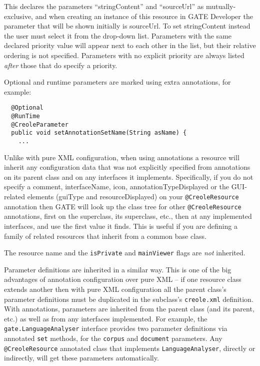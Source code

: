 This declares the parameters ``stringContent'' and ``sourceUrl'' as
mutually-exclusive, and when creating an instance of this resource in GATE
Developer the parameter that will be shown initially is sourceUrl.  To set
stringContent instead the user must select it from the drop-down list.
Parameters with the same declared priority value will appear next to each other
in the list, but their relative ordering is not specified.  Parameters with no
explicit priority are always listed {\it after} those that do specify a
priority.

Optional and runtime parameters are marked using extra annotations, for example:
\begin{lstlisting}
  @Optional
  @RunTime
  @CreoleParameter
  public void setAnnotationSetName(String asName) {
    ...
\end{lstlisting}


Unlike with pure XML configuration, when using annotations a resource
will inherit any configuration data that was not explicitly specified
from annotations on its parent class and on any interfaces it
implements.  Specifically, if you do not specify a comment,
interfaceName, icon, annotationTypeDisplayed or the GUI-related
elements (guiType and resourceDisplayed) on
your \verb|@CreoleResource| annotation then GATE will look up the
class tree for other \verb|@CreoleResource| annotations, first on the
superclass, its superclass, etc., then at any implemented interfaces,
and use the first value it finds.  This is useful if you are defining
a family of related resources that inherit from a common base class.

The resource name and the {\tt isPrivate} and {\tt mainViewer} flags are
\emph{not} inherited.

Parameter definitions are inherited in a similar way.  This is one of the big
advantages of annotation configuration over pure XML -- if one resource class
extends another then with pure XML configuration all the parent class's
parameter definitions must be duplicated in the subclass's {\tt creole.xml}
definition.  With annotations, parameters are inherited from the parent class
(and its parent, etc.) as well as from any interfaces implemented.  For
example, the {\tt gate.LanguageAnalyser} interface provides two parameter
definitions via annotated {\tt set} methods, for the {\tt corpus} and
{\tt document} parameters.  Any \verb|@CreoleResource| annotated class that
implements {\tt LanguageAnalyser}, directly or indirectly, will get these
parameters automatically.

